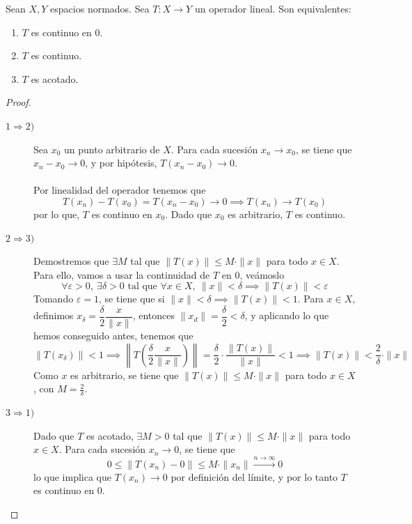 \begin{prop}\label{prop:continuidad-acotado}
    Sean $X, Y$ espacios normados. Sea $T: X \longrightarrow Y$ un operador lineal. Son equivalentes:
    \begin{enumerate}
        \item[i)] $T$ es continuo en $0$.
        \item[ii)] $T$ es continuo.
        \item[iii)] $T$ es acotado.
    \end{enumerate}

\begin{proof}\
    \begin{description}
        \item[$1\Longrightarrow 2)$] Sea $x_0$ un punto arbitrario de $X$. Para cada sucesión $x_n \longrightarrow x_0$, se tiene que $x_n - x_0 \longrightarrow 0$, y por hipótesis, $T(x_n - x_0) \longrightarrow 0$.  \\ \\
        \noindent
        Por linealidad del operador tenemos que 
        \begin{equation*}
            T(x_n) - T(x_0) = T(x_n - x_0) \longrightarrow 0 \implies T(x_n) \longrightarrow T(x_0)
        \end{equation*}
        por lo que, $T$ es continuo en $x_0$. Dado que $x_0$ es arbitrario, $T$ es continuo. \\
        \item[$2\Longrightarrow 3)$] Demostremos que $\exists M$ tal que $\|T(x)\| \leq M \cdot \|x\|$ para todo $x \in X$. Para ello, vamos a usar la continuidad de $T$ en $0$, veámoslo
        \begin{equation*}
            \forall \varepsilon > 0, \ \exists \delta > 0 \text{ tal que } \forall x\in X, \ \|x\| < \delta \implies \|T(x)\| < \varepsilon
        \end{equation*}
        Tomando $\varepsilon = 1$, se tiene que si $\|x\| < \delta \implies \|T(x)\| < 1$. Para $x\in X$, definimos $x_\delta=\dfrac{\delta}{2}\dfrac{x}{\|x\|}$, entonces $\|x_d\| = \dfrac{\delta}{2}< \delta$, y aplicando lo que hemos conseguido antes, tenemos que 
        \begin{equation*}
            \|T(x_\delta)\| < 1 \implies \left\|T\left(\frac{\delta}{2} \frac{x}{\|x\|}\right)\right\| = \frac{\delta}{2} \cdot \frac{\|T(x)\|}{\|x\|} < 1 \implies \|T(x)\| < \frac{2}{\delta} \cdot \|x\|
        \end{equation*}
        Como $x$ es arbitrario, se tiene que $\|T(x)\| \leq M \cdot \|x\|$ para todo $x \in X$, con $M = \frac{2}{\delta}$. \\
        \item[$3\Longrightarrow 1)$] Dado que $T$ es acotado, $\exists M > 0$ tal que $\|T(x)\| \leq M \cdot \|x\|$ para todo $x \in X$. Para cada sucesión $x_n \longrightarrow 0$, se tiene que $$0\leq\|T(x_n)-0\| \leq M \cdot \|x_n\| \xrightarrow{n \to \infty} 0$$
        lo que implica que $T(x_n) \longrightarrow 0$ por definición del límite, y por lo tanto $T$ es continuo en $0$.
    \end{description}
\end{proof}
\end{prop}


